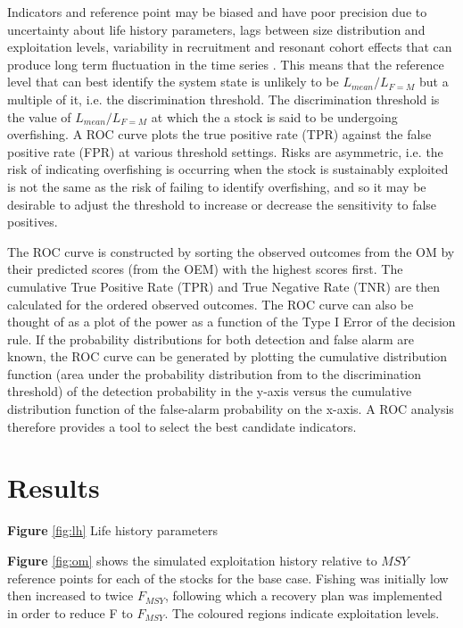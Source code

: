\documentclass[12pt,doublespacing,a4paper]{ouparticle}
\begin{document}
Indicators and reference point may be biased and have poor precision due to uncertainty about life history parameters, lags between size distribution and exploitation levels, variability in recruitment and resonant cohort effects that can produce long term fluctuation in the time series \citep{botsford2014cohort,bjoernstad2004trends}. This means that the reference level that can best identify the system state is unlikely to be $L_{mean}/L_{F=M}$ but a multiple of it, i.e. the discrimination threshold. The discrimination threshold is the value of $L_{mean}/L_{F=M}$ at which the a stock is said to be undergoing overfishing. A ROC curve plots the true positive rate (TPR) against the false positive rate  (FPR) at various threshold settings. Risks are asymmetric, i.e. the risk of indicating overfishing is occurring when the stock is sustainably exploited is not the same as the risk of failing to identify overfishing, and so it may be desirable to adjust the threshold to increase or decrease the sensitivity to false positives.

The ROC curve is constructed by sorting the observed outcomes from the OM by their predicted scores (from the OEM) with the highest scores first. The cumulative True Positive Rate (TPR) and True Negative Rate (TNR) are then calculated for the ordered observed outcomes. The ROC curve can also be thought of as a plot of the power as a function of the Type I Error of the decision rule. If the probability distributions for both detection and false alarm are known, the ROC curve can be generated by plotting the cumulative distribution function (area under the probability distribution from  to the discrimination threshold) of the detection probability in the y-axis versus the cumulative distribution function of the false-alarm probability on the x-axis. A ROC analysis therefore provides a tool to select the best candidate indicators. 


\section{Results}


\textbf{Figure} \ref{fig:lh} Life history parameters

\textbf{Figure} \ref{fig:om} shows the simulated exploitation history relative to $MSY$ reference points for each of the stocks for the base case. Fishing was initially low then increased to twice $F_{MSY}$, following which a recovery plan was implemented in order to reduce F to $F_{MSY}$. The coloured regions indicate exploitation levels.
\end{document}
